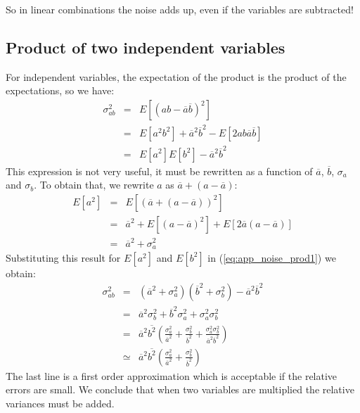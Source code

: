 So in linear combinations the noise adds up, even
if the variables are subtracted!

\subsection{Product of two independent variables}
For independent variables, the expectation of the product is the
product of the expectations, so we have:
\begin{align}
 \sigma_{ab}^2 & = & E\left[\left( ab - \overline{a} \overline{b}\right)^2\right] \nonumber\\
  & = & E\left[a^2b^2\right] + \overline{a}^2\overline{b}^2 - E\left[2 a b \overline{a} \overline{b}\right] \nonumber\\
  & = & E\left[a^2\right] E\left[b^2\right] - \overline{a}^2 \overline{b}^2 \label{eq:app_noise_prod1}
\end{align}
This expression is not very useful, it must be rewritten as a function of
$\overline{a}$, $\overline{b}$, $\sigma_a$ and $\sigma_b$. To obtain that, we rewrite $a$
as $\overline{a} + (a - \overline{a})$:
\begin{align}
  E\left[a^2\right] & = & E\left[(\overline{a} + (a - \overline{a}))^2\right] \nonumber\\
 & = & \overline{a}^2 + E\left[\left( a - \overline{a} \right)^2\right] + E\left[2 \overline{a}(a - \overline{a})\right]
       \nonumber\\
 & = & \overline{a}^2 + \sigma_a^2
\end{align}
Substituting this result for $E[a^2]$ and $E[b^2]$ in
(\ref{eq:app_noise_prod1}) we obtain:
\begin{align}
\sigma_{ab}^2 & = & (\overline{a}^2 + \sigma_a^2)(\overline{b}^2 + \sigma_b^2) 
                     - \overline{a}^2 \overline{b}^2 \nonumber\\
 & = & \overline{a}^2\sigma_b^2 + \overline{b}^2\sigma_a^2 + \sigma_a^2 \sigma_b^2
        \nonumber\\
 & = & \overline{a}^2\overline{b^2}\left( \frac{\sigma_a^2}{\overline{a}^2} + 
       \frac{\sigma_b^2}{\overline{b}^2} 
     + \frac{\sigma_a^2\sigma_b^2}{\overline{a}^2\overline{b}^2}\right)\\
 & \simeq & \overline{a}^2\overline{b^2}\left( \frac{\sigma_a^2}{\overline{a}^2} + 
       \frac{\sigma_b^2}{\overline{b}^2}\right)
\end{align}
The last line is a first order approximation which is acceptable if the
relative errors are small. We conclude that when two variables are multiplied
the relative variances must be added. 

